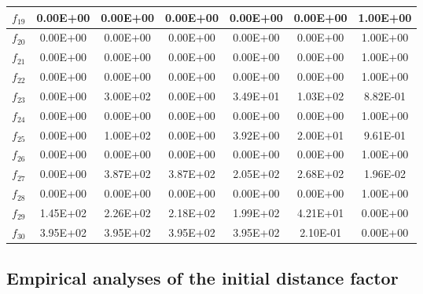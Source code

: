 \begin{table}[t]
\begin{scriptsize}
\begin{tabular}{|c|c|c|c|c|c|c|}
$f_{19}$ & 0.00E+00 & 0.00E+00 & 0.00E+00 & 0.00E+00 & 0.00E+00 & 1.00E+00 \\ \hline
$f_{20}$ & 0.00E+00 & 0.00E+00 & 0.00E+00 & 0.00E+00 & 0.00E+00 & 1.00E+00 \\ \hline
$f_{21}$ & 0.00E+00 & 0.00E+00 & 0.00E+00 & 0.00E+00 & 0.00E+00 & 1.00E+00 \\ \hline
$f_{22}$ & 0.00E+00 & 0.00E+00 & 0.00E+00 & 0.00E+00 & 0.00E+00 & 1.00E+00 \\ \hline
$f_{23}$ & 0.00E+00 & 3.00E+02 & 0.00E+00 & 3.49E+01 & 1.03E+02 & 8.82E-01 \\ \hline
$f_{24}$ & 0.00E+00 & 0.00E+00 & 0.00E+00 & 0.00E+00 & 0.00E+00 & 1.00E+00 \\ \hline
$f_{25}$ & 0.00E+00 & 1.00E+02 & 0.00E+00 & 3.92E+00 & 2.00E+01 & 9.61E-01 \\ \hline
$f_{26}$ & 0.00E+00 & 0.00E+00 & 0.00E+00 & 0.00E+00 & 0.00E+00 & 1.00E+00 \\ \hline
$f_{27}$ & 0.00E+00 & 3.87E+02 & 3.87E+02 & 2.05E+02 & 2.68E+02 & 1.96E-02 \\ \hline
$f_{28}$ & 0.00E+00 & 0.00E+00 & 0.00E+00 & 0.00E+00 & 0.00E+00 & 1.00E+00 \\ \hline
$f_{29}$ & 1.45E+02 & 2.26E+02 & 2.18E+02 & 1.99E+02 & 4.21E+01 & 0.00E+00 \\ \hline
$f_{30}$ & 3.95E+02 & 3.95E+02 & 3.95E+02 & 3.95E+02 & 2.10E-01 & 0.00E+00 \\ \hline
\end{tabular}%
\end{scriptsize}
\end{table}

\subsection{Empirical analyses of the initial distance factor}

